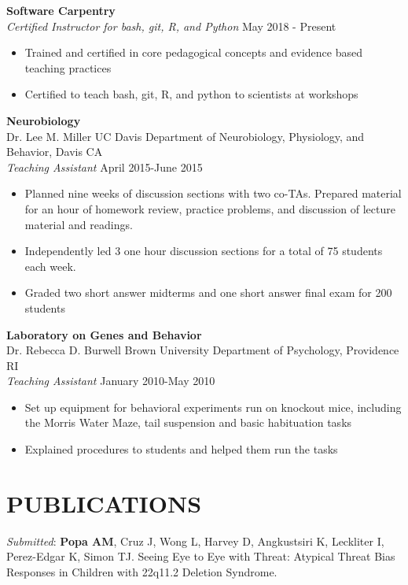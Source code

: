 \documentclass[line,margin,10pt]{res}
\begin{document}
\begin{resume}
   \textbf{Software Carpentry} \\ 
 {\sl Certified Instructor for bash, git, R, and Python} \hfill May 2018 - Present
 \begin{itemize}\itemsep -2pt
 \item Trained and certified in core pedagogical concepts and evidence based teaching practices
 \item Certified to teach bash, git, R, and python to scientists at workshops 
 \end{itemize}
 
 \textbf{Neurobiology}\\
 Dr. Lee M. Miller \hfill UC Davis Department of Neurobiology, Physiology, and Behavior, Davis CA\\
 {\sl Teaching Assistant} \hfill April 2015-June 2015
 \begin{itemize}\itemsep -2pt
 \item Planned nine weeks of discussion sections with two co-TAs. Prepared material for an hour of homework review, practice problems, and discussion of lecture material and readings.
 \item Independently led 3 one hour discussion sections for a total of 75 students each week.
 \item Graded two short answer midterms and one short answer final exam for 200 students  \end{itemize}
 
 \textbf{Laboratory on Genes and Behavior}\\
 Dr. Rebecca D. Burwell \hfill Brown University Department of Psychology, Providence RI\\
 {\sl Teaching Assistant} \hfill January 2010-May 2010
\begin{itemize}\itemsep -2pt
\item Set up equipment for behavioral experiments run on knockout mice, including the Morris Water Maze, tail suspension and basic habituation tasks
\item Explained procedures to students and helped them run the tasks
\end{itemize}

\section{PUBLICATIONS}
{\sl Submitted}: \textbf{Popa AM}, Cruz J, Wong L, Harvey D, Angkustsiri K, Leckliter I, Perez-Edgar K, Simon TJ. Seeing Eye to Eye with Threat: Atypical Threat Bias Responses in Children with 22q11.2 Deletion Syndrome.


\end{resume}
\end{document}
